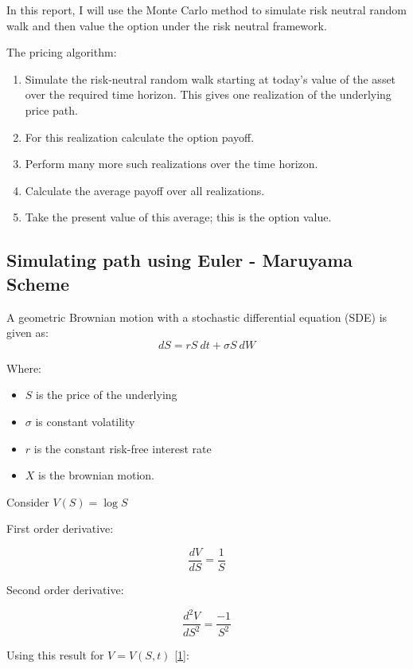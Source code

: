 \documentclass[11pt]{article}
\begin{document}
    In this report, I will use the Monte Carlo method to simulate risk
neutral random walk and then value the option under the risk neutral
framework.

    The pricing algorithm:

\begin{enumerate}
\def\labelenumi{\arabic{enumi}.}
\item
  Simulate the risk-neutral random walk starting at today's value of the
  asset over the required time horizon. This gives one realization of
  the underlying price path.
\item
  For this realization calculate the option payoff.
\item
  Perform many more such realizations over the time horizon.
\item
  Calculate the average payoff over all realizations.
\item
  Take the present value of this average; this is the option value.
\end{enumerate}

    \subsection{Simulating path using Euler - Maruyama
Scheme}\label{simulating-path-using-euler---maruyama-scheme}

    A geometric Brownian motion with a stochastic differential equation
(SDE) is given as: \[
dS = r S \: dt + \sigma S \: dW
\]

    Where:

\begin{itemize}
\item
  \(S\) is the price of the underlying
\item
  \(\sigma\) is constant volatility
\item
  \(r\) is the constant risk-free interest rate
\item
  \(X\) is the brownian motion.
\end{itemize}

    Consider \(V(S) = \log S\)

    First order derivative:

\[
\frac{dV}{dS}= \frac{1}{S} \tag{1}
\]

Second order derivative:

\[
\frac{d^{2}V}{dS^{2}} = \frac{-1}{S^{2}} \tag{2}
\]

    Using this result for \(V = V(S,t)\) \hyperref[1]{[1]}:
\end{document}
